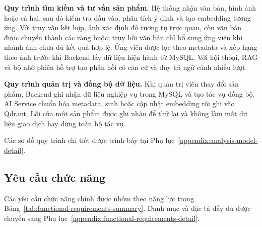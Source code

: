 \textbf{Quy trình tìm kiếm và tư vấn sản phẩm.}
Hệ thống nhận văn bản, hình ảnh hoặc cả hai, sau đó kiểm tra đầu vào, phân tích
ý định và tạo embedding tương ứng. Với truy vấn kết hợp, ảnh xác định độ tương
tự trực quan, còn văn bản được chuyển thành các ràng buộc; truy hồi văn bản chỉ
bổ sung ứng viên khi nhánh ảnh chưa đủ kết quả hợp lệ. Ứng viên được lọc theo
metadata và xếp hạng theo ảnh trước khi Backend lấy dữ liệu hiện hành từ MySQL.
Với hội thoại, RAG và bộ nhớ phiên hỗ trợ tạo phản hồi có căn cứ và duy trì ngữ
cảnh nhiều lượt.

\textbf{Quy trình quản trị và đồng bộ dữ liệu.}
Khi quản trị viên thay đổi sản phẩm, Backend ghi nhận dữ liệu nghiệp vụ trong
MySQL và tạo tác vụ đồng bộ. AI Service chuẩn hóa metadata, sinh hoặc cập nhật
embedding rồi ghi vào Qdrant. Lỗi của một sản phẩm được ghi nhận để thử lại và
không làm mất dữ liệu giao dịch hay dừng toàn bộ tác vụ.

Các sơ đồ quy trình chi tiết được trình bày tại
Phụ lục~\ref{appendix:analysis-model-detail}.

\subsection{Yêu cầu chức năng}

Các yêu cầu chức năng chính được nhóm theo năng lực trong
Bảng~\ref{tab:functional-requirements-summary}. Danh mục và đặc tả đầy đủ được chuyển sang
Phụ lục~\ref{appendix:functional-requirements-detail}.

